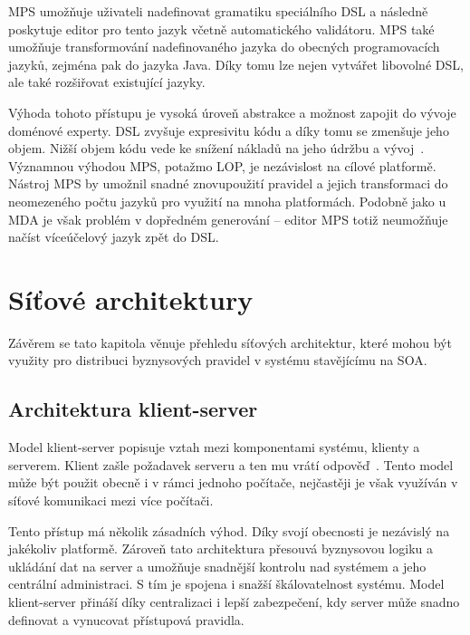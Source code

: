 MPS umožňuje uživateli nadefinovat gramatiku speciálního \gls{DSL} a následně poskytuje
editor pro tento jazyk včetně automatického validátoru. MPS také umožňuje transformování
nadefinovaného jazyka do obecných programovacích jazyků, zejména pak do jazyka Java.
Díky tomu lze nejen vytvářet libovolné \gls{DSL}, ale také rozšiřovat existující jazyky.

Výhoda tohoto přístupu je vysoká úroveň abstrakce a možnost zapojit do vývoje doménové experty.
\gls{DSL} zvyšuje expresivitu kódu a díky tomu se zmenšuje jeho objem.
Nižší objem kódu vede ke snížení nákladů na jeho údržbu a vývoj~\cite{littman1987mental, soloway1986empirical}.
Významnou výhodou MPS, potažmo \gls{LOP}, je nezávislost na cílové platformě.
Nástroj MPS by umožnil snadné znovupoužití pravidel a jejich transformaci do neomezeného počtu jazyků pro
využití na mnoha platformách. Podobně jako u \gls{MDA} je však problém v dopředném
generování -- editor MPS totiž neumožňuje načíst víceúčelový jazyk zpět do \gls{DSL}.

\section{Síťové architektury}

Závěrem se tato kapitola věnuje přehledu síťových architektur, které mohou být využity pro
distribuci byznysových pravidel v systému stavějícímu na \gls{SOA}.

\subsection{Architektura klient-server}\label{sec:client-server}

Model klient-server popisuje vztah mezi komponentami systému, klienty a serverem.
Klient zašle požadavek serveru a ten mu vrátí odpověď~\cite{berson1992client}.
Tento model může být použit obecně i v rámci jednoho počítače,
nejčastěji je však využíván v síťové komunikaci mezi více počítači.


Tento přístup má několik zásadních výhod. Díky svojí obecnosti je nezávislý
na jakékoliv platformě. Zároveň tato architektura přesouvá byznysovou logiku a
ukládání dat na server a umožňuje snadnější kontrolu nad systémem a jeho centrální
administraci. S tím je spojena i snažší škálovatelnost systému. Model klient-server
přináší díky centralizaci i lepší zabezpečení, kdy server může snadno definovat a
vynucovat přístupová pravidla.

